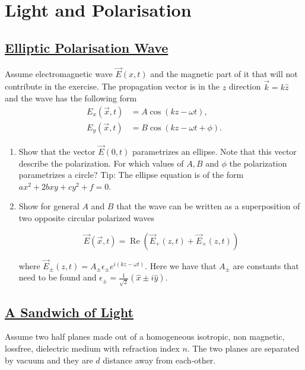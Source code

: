 \section{Light and Polarisation}

\subsection{\hyperref[EllipticPolarisationWave]{Elliptic Polarisation Wave}}

Assume electromagnetic wave $\vec{E}(x, t)$ and the magnetic part of it that will not contribute in the exercise. The propagation vector is in the $z$ direction $\vec{k}=k \hat{z}$ and the wave has the following form
\begin{subequations}
	\begin{align}
		E_{x}(\vec{x}, t)&=A \cos (k z-\omega t), \\
		E_{y}(\vec{x}, t)&=B \cos (k z-\omega t+\phi).
	\end{align}
\end{subequations}

\begin{enumerate}
	\item Show that the vector $\vec{E}(0, t)$ parametrizes an ellipse. Note that this vector describe the polarization. For which values of $A, B$ and $\phi$ the polarization parametrizes a circle? Tip: The ellipse equation is of the form $a x^{2}+2 b x y+c y^{2}+f=0$.
	\item Show for general $A$ and $B$ that the wave can be written as a superposition of two opposite circular polarized waves

	\begin{equation}
		\vec{E}(\vec{x}, t)=\operatorname{Re}\left(\vec{E}_{+}(z, t)+\vec{E}_{+}(z, t)\right)
	\end{equation}

	where $\vec{E}_{\pm}(z, t)=A_{\pm} \epsilon_{\pm} e^{i(k z-\omega t)}$. Here we have that $A_{\pm}$ are constants that need to be found and $\epsilon_{\pm}=\frac{1}{\sqrt{2}}(\hat{x} \pm i \hat{y}).$
\end{enumerate}

\subsection{\hyperref[ASandwichofLight]{A Sandwich of Light}}

Assume two half planes made out of a homogeneous isotropic, non magnetic, lossfree, dielectric medium with refraction index $n .$ The two planes are separated by vacuum and they are $d$ distance away from each-other.

